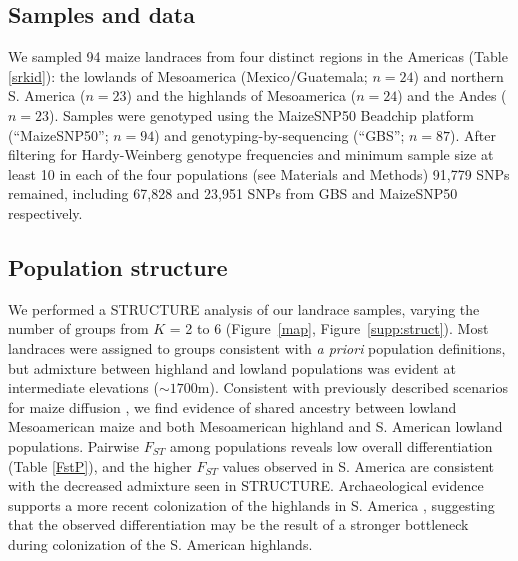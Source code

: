 \subsection*{Samples and data}

We sampled 94 maize landraces from four distinct regions in the Americas (Table \ref{srkid}): the lowlands of Mesoamerica (Mexico/Guatemala; $n=24$) and northern S. America ($n=23$) and the highlands of Mesoamerica ($n=24$) and the Andes ($n=23$). 
Samples were genotyped using the MaizeSNP50 Beadchip platform (``MaizeSNP50''; $n=94$) and genotyping-by-sequencing (``GBS''; $n=87$). 
After filtering for Hardy-Weinberg genotype frequencies and minimum sample size at least 10 in each of the four populations (see Materials and Methods) 91,779 SNPs remained, including 67,828 and 23,951 SNPs from GBS and MaizeSNP50 respectively.  

\subsection*{Population structure}

We performed a {\sf STRUCTURE} analysis \cite[]{Pritchard_2000_10835412,Falush_2003_12930761} of our landrace samples, varying the number of groups from $K$ = 2 to 6 (Figure~\ref{map}, Figure~\ref{supp:struct}). 
Most landraces were assigned to groups consistent with \emph{a priori} population definitions, but admixture between highland and lowland populations was evident at intermediate elevations ($\sim1700$m).  Consistent with previously described scenarios for maize diffusion \cite[]{Piperno_2006_69}, we find evidence of shared ancestry between lowland Mesoamerican maize and both Mesoamerican highland and S. American lowland populations.  Pairwise $F_{ST}$ among populations reveals low overall differentiation (Table \ref{FstP}), and the higher $F_{ST}$ values observed in S. America are consistent with the decreased admixture seen in {\sf STRUCTURE}.  Archaeological evidence supports a more recent colonization of the highlands in S. America  \cite[]{Piperno_2006_69,Perry_2006_16511492,Grobman_2012_22307642}, suggesting that the observed differentiation may be the result of a stronger bottleneck during colonization of the S. American highlands.  

